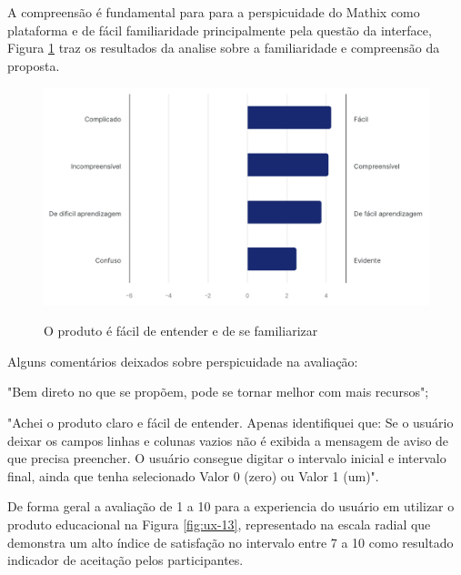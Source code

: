A compreensão é fundamental para para a perspicuidade do Mathix como plataforma e de fácil familiaridade principalmente pela questão da interface, Figura \ref{fig:ux-11} traz os resultados da analise sobre a familiaridade e compreensão da proposta.


\begin{figure}[h!]
    \caption{O produto é fácil de entender e de se familiarizar}
    \centering
    \includegraphics[scale=0.4]{figuras/resultados/ux-11.png}
    \label{fig:ux-11}
\end{figure}

Alguns comentários deixados sobre perspicuidade na avaliação:

\begin{citacao}
\item "Bem direto no que se propõem, pode se tornar melhor com mais recursos";
\item "Achei o produto claro e fácil de entender. Apenas identifiquei que: Se o usuário deixar os campos linhas e colunas vazios não é exibida a mensagem de aviso de que precisa preencher. O usuário consegue digitar o intervalo inicial e intervalo final, ainda que tenha selecionado Valor 0 (zero) ou Valor 1 (um)".
\end{citacao}




De forma geral a avaliação de 1 a 10 para a experiencia do usuário em utilizar o produto educacional na Figura \ref{fig:ux-13}, representado na escala radial que demonstra um alto índice de satisfação no intervalo entre 7 a 10 como resultado indicador de aceitação pelos participantes.

